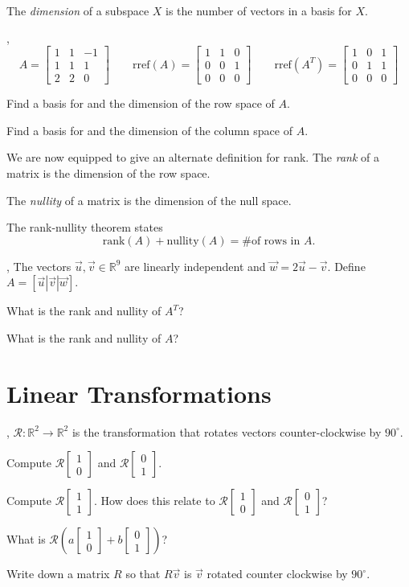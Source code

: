 \documentclass[letter]{article}
\newcommand{\R}{\mathbb{R}}
\newcommand{\rref}{\mathrm{rref}}
\newcommand{\rank}{\mathrm{rank}}
\newcommand{\nnul}{\mathrm{nullity}}
\newcommand{\mat}[1]{\begin{bmatrix}#1\end{bmatrix}}
\begin{document}
\begin{Def}
The \emph{dimension} of a subspace $X$ is the number of vectors in a basis for $X$.
\end{Def}

\sep
\[
	A=\mat{1&1&-1\\1&1&1\\2&2&0}\qquad
	\rref(A)=\mat{1&1&0\\0&0&1\\0&0&0}\qquad
	\rref(A^T)=\mat{1&0&1\\0&1&1\\0&0&0}
\]

\begin{Enum}
	\item Find a basis for and the dimension of the row space of $A$.
	\item Find a basis for and the dimension of the column space of $A$.
\end{Enum}

\begin{Def}
We are now equipped to give an alternate definition for rank.  The \emph{rank}
of a matrix is the dimension of the row space.

The \emph{nullity} of a matrix is the dimension of the null space.

The rank-nullity theorem states
\[
	\rank(A)+\nnul(A) = \#\text{of rows in }A.
\]
\end{Def}

\sep
The vectors $\vec u,\vec v\in\R^9$ are linearly independent and $\vec w=2\vec u-\vec v$.
Define $A=[\vec u|\vec v|\vec w]$.
\begin{Enum}
	\item What is the rank and nullity of $A^T$?
	\item What is the rank and nullity of $A$?
\end{Enum}

\newpage
\section*{Linear Transformations}

\sep
$\mathcal R:\R^2\to\R^2$ is the transformation that rotates vectors counter-clockwise 
by $90^\circ$.
\begin{Enum}
	\item Compute $\mathcal R\mat{1\\0}$ and $\mathcal R\mat{0\\1}$.
	\item Compute $\mathcal R\mat{1\\1}$.  How does this relate to
		$\mathcal R\mat{1\\0}$ and $\mathcal R\mat{0\\1}$?
	\item What is $\mathcal R\left(a\mat{1\\0}+b\mat{0\\1}\right)$?
	\item Write down a matrix $R$ so that $R\vec v$ is $\vec v$ rotated
		counter clockwise by $90^\circ$.
\end{Enum}
\end{document}
